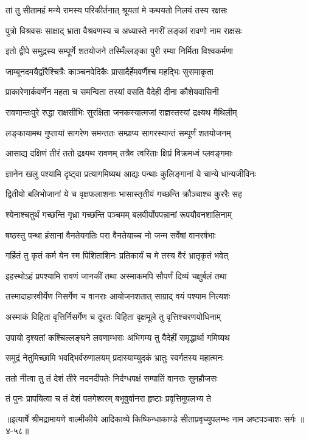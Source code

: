 \twolineshloka
{तां तु सीतामहं मन्ये रामस्य परिकीर्तनात्}
{श्रूयतां मे कथयतो निलयं तस्य रक्षसः} %

\twolineshloka
{पुत्रो विश्रवसः साक्षाद् भ्राता वैश्रवणस्य च}
{अध्यास्ते नगरीं लङ्कां रावणो नाम राक्षसः} %

\twolineshloka
{इतो द्वीपे समुद्रस्य सम्पूर्णे शतयोजने}
{तस्मिँल्लङ्का पुरी रम्या निर्मिता विश्वकर्मणा} %

\twolineshloka
{जाम्बूनदमयैर्द्वारैश्चित्रैः काञ्चनवेदिकैः}
{प्रासादैर्हेमवर्णैश्च महद्भिः सुसमाकृता} %

\twolineshloka
{प्राकारेणार्कवर्णेन महता च समन्विता}
{तस्यां वसति वैदेही दीना कौशेयवासिनी} %

\twolineshloka
{रावणान्तःपुरे रुद्धा राक्षसीभिः सुरक्षिता}
{जनकस्यात्मजां राज्ञस्तस्यां द्रक्ष्यथ मैथिलीम्} %

\twolineshloka
{लङ्कायामथ गुप्तायां सागरेण समन्ततः}
{सम्प्राप्य सागरस्यान्तं सम्पूर्णं शतयोजनम्} %

\twolineshloka
{आसाद्य दक्षिणं तीरं ततो द्रक्ष्यथ रावणम्}
{तत्रैव त्वरिताः क्षिप्रं विक्रमध्वं प्लवङ्गमाः} %

\twolineshloka
{ज्ञानेन खलु पश्यामि दृष्ट्वा प्रत्यागमिष्यथ}
{आद्यः पन्थाः कुलिङ्गानां ये चान्ये धान्यजीविनः} %

\twolineshloka
{द्वितीयो बलिभोजानां ये च वृक्षफलाशनाः}
{भासास्तृतीयं गच्छन्ति क्रौञ्चाश्च कुररैः सह} %

\twolineshloka
{श्येनाश्चतुर्थं गच्छन्ति गृध्रा गच्छन्ति पञ्चमम्}
{बलवीर्योपपन्नानां रूपयौवनशालिनाम्} %

\twolineshloka
{षष्ठस्तु पन्था हंसानां वैनतेयगतिः परा}
{वैनतेयाच्च नो जन्म सर्वेषां वानरर्षभाः} %

\twolineshloka
{गर्हितं तु कृतं कर्म येन स्म पिशिताशिनः}
{प्रतिकार्यं च मे तस्य वैरं भ्रातृकृतं भवेत्} %

\twolineshloka
{इहस्थोऽहं प्रपश्यामि रावणं जानकीं तथा}
{अस्माकमपि सौपर्णं दिव्यं चक्षुर्बलं तथा} %

\twolineshloka
{तस्मादाहारवीर्येण निसर्गेण च वानराः}
{आयोजनशतात् साग्राद् वयं पश्याम नित्यशः} %

\twolineshloka
{अस्माकं विहिता वृत्तिर्निसर्गेण च दूरतः}
{विहिता वृक्षमूले तु वृत्तिश्चरणयोधिनाम्} %

\twolineshloka
{उपायो दृश्यतां कश्चिल्लङ्घने लवणाम्भसः}
{अभिगम्य तु वैदेहीं समृद्धार्था गमिष्यथ} %

\twolineshloka
{समुद्रं नेतुमिच्छामि भवद्भिर्वरुणालयम्}
{प्रदास्याम्युदकं भ्रातुः स्वर्गतस्य महात्मनः} %

\twolineshloka
{ततो नीत्वा तु तं देशं तीरे नदनदीपतेः}
{निर्दग्धपक्षं सम्पातिं वानराः सुमहौजसः} %

\twolineshloka
{तं पुनः प्रापयित्वा च तं देशं पतगेश्वरम्}
{बभूवुर्वानरा हृष्टाः प्रवृत्तिमुपलभ्य ते} %


॥इत्यार्षे श्रीमद्रामायणे वाल्मीकीये आदिकाव्ये किष्किन्धाकाण्डे सीताप्रवृच्युपलम्भः नाम अष्टपञ्चाशः सर्गः ॥४-५८॥

